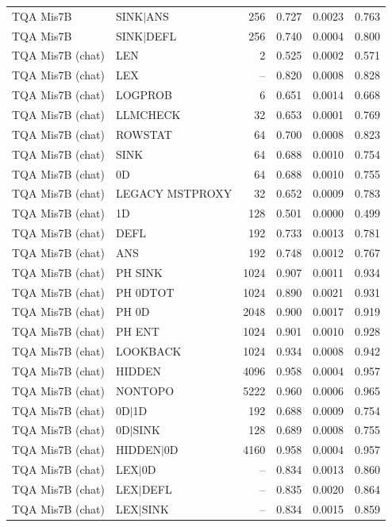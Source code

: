 \begin{longtable}{llrrrr}
TQA Mis7B & SINK$\mid$ANS & 256 & 0.727 & 0.0023 & 0.763 \\
TQA Mis7B & SINK$\mid$DEFL & 256 & 0.740 & 0.0004 & 0.800 \\
TQA Mis7B (chat) & LEN & 2 & 0.525 & 0.0002 & 0.571 \\
TQA Mis7B (chat) & LEX & -- & 0.820 & 0.0008 & 0.828 \\
TQA Mis7B (chat) & LOGPROB & 6 & 0.651 & 0.0014 & 0.668 \\
TQA Mis7B (chat) & LLMCHECK & 32 & 0.653 & 0.0001 & 0.769 \\
TQA Mis7B (chat) & ROWSTAT & 64 & 0.700 & 0.0008 & 0.823 \\
TQA Mis7B (chat) & SINK & 64 & 0.688 & 0.0010 & 0.754 \\
TQA Mis7B (chat) & 0D & 64 & 0.688 & 0.0010 & 0.755 \\
TQA Mis7B (chat) & LEGACY MSTPROXY & 32 & 0.652 & 0.0009 & 0.783 \\
TQA Mis7B (chat) & 1D & 128 & 0.501 & 0.0000 & 0.499 \\
TQA Mis7B (chat) & DEFL & 192 & 0.733 & 0.0013 & 0.781 \\
TQA Mis7B (chat) & ANS & 192 & 0.748 & 0.0012 & 0.767 \\
TQA Mis7B (chat) & PH SINK & 1024 & 0.907 & 0.0011 & 0.934 \\
TQA Mis7B (chat) & PH 0DTOT & 1024 & 0.890 & 0.0021 & 0.931 \\
TQA Mis7B (chat) & PH 0D & 2048 & 0.900 & 0.0017 & 0.919 \\
TQA Mis7B (chat) & PH ENT & 1024 & 0.901 & 0.0010 & 0.928 \\
TQA Mis7B (chat) & LOOKBACK & 1024 & 0.934 & 0.0008 & 0.942 \\
TQA Mis7B (chat) & HIDDEN & 4096 & 0.958 & 0.0004 & 0.957 \\
TQA Mis7B (chat) & NONTOPO & 5222 & 0.960 & 0.0006 & 0.965 \\
TQA Mis7B (chat) & 0D$\mid$1D & 192 & 0.688 & 0.0009 & 0.754 \\
TQA Mis7B (chat) & 0D$\mid$SINK & 128 & 0.689 & 0.0008 & 0.755 \\
TQA Mis7B (chat) & HIDDEN$\mid$0D & 4160 & 0.958 & 0.0004 & 0.957 \\
TQA Mis7B (chat) & LEX$\mid$0D & -- & 0.834 & 0.0013 & 0.860 \\
TQA Mis7B (chat) & LEX$\mid$DEFL & -- & 0.835 & 0.0020 & 0.864 \\
TQA Mis7B (chat) & LEX$\mid$SINK & -- & 0.834 & 0.0015 & 0.859 \\

\end{longtable}
